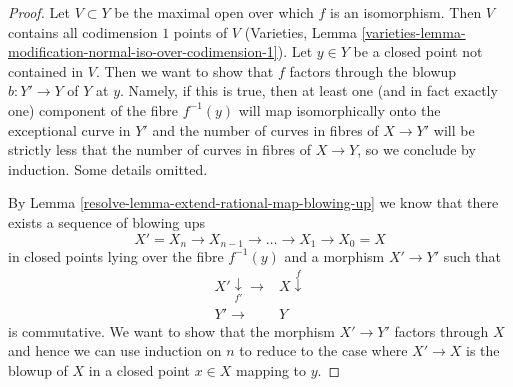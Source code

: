 \begin{proof}

Let $V \subset Y$ be the maximal open over which $f$ is an isomorphism.
Then $V$ contains all codimension $1$ points of $V$ (Varieties,
Lemma \ref{varieties-lemma-modification-normal-iso-over-codimension-1}).
Let $y \in Y$ be a closed point not contained in $V$.
Then we want to show that $f$ factors through the blowup $b : Y' \to Y$
of $Y$ at $y$. Namely, if this is true, then at least one (and in fact
exactly one) component of the fibre $f^{-1}(y)$ will map isomorphically
onto the exceptional curve in $Y'$ and the number of curves
in fibres of $X \to Y'$ will be strictly less that the number of curves
in fibres of $X \to Y$, so we conclude by induction. Some details omitted.

\medskip\noindent
By Lemma \ref{resolve-lemma-extend-rational-map-blowing-up}
we know that there exists a sequence of blowing ups
$$
X' = X_n \to X_{n - 1} \to \ldots \to X_1 \to X_0 = X
$$
in closed points lying over the fibre $f^{-1}(y)$
and a morphism $X' \to Y'$ such that
$$
\begin{array}{cc}X' \underset{f'}{\downarrow}\longrightarrow & X \overset{f}{\downarrow} \\ Y' \longrightarrow & Y\end{array}
$$
is commutative. We want to show that the morphism $X' \to Y'$
factors through $X$ and hence we can use induction on $n$ to
reduce to the case where $X' \to X$ is the blowup of $X$
in a closed point $x \in X$ mapping to $y$.


\end{proof}

